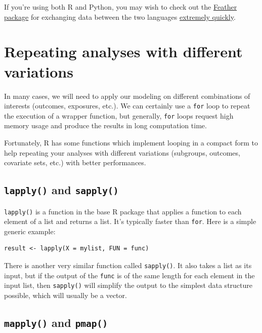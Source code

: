 \documentclass[
]{book}
\begin{document}
If you're using both R and Python, you may wish to check out the \href{https://www.rdocumentation.org/packages/feather/versions/0.3.3}{Feather package} for exchanging data between the two languages \href{https://blog.rstudio.com/2016/03/29/feather/}{extremely quickly}.

\section{Repeating analyses with different variations}\label{repeating-analyses-with-different-variations}

In many cases, we will need to apply our modeling on different combinations of interests (outcomes, exposures, etc.). We can certainly use a \texttt{for} loop to repeat the execution of a wrapper function, but generally, \texttt{for} loops request high memory usage and produce the results in long computation time.

Fortunately, R has some functions which implement looping in a compact form to help repeating your analyses with different variations (subgroups, outcomes, covariate sets, etc.) with better performances.

\subsection{\texorpdfstring{\texttt{lapply()} and \texttt{sapply()}}{lapply() and sapply()}}\label{lapply-and-sapply}

\texttt{lapply()} is a function in the base R package that applies a function to each element of a list and returns a list. It's typically faster than \texttt{for}. Here is a simple generic example:

\begin{verbatim}
result <- lapply(X = mylist, FUN = func)
\end{verbatim}

There is another very similar function called \texttt{sapply()}. It also takes a list as its input, but if the output of the \texttt{func} is of the same length for each element in the input list, then \texttt{sapply()} will simplify the output to the simplest data structure possible, which will usually be a vector.

\subsection{\texorpdfstring{\texttt{mapply()} and \texttt{pmap()}}{mapply() and pmap()}}\label{mapply-and-pmap}
\end{document}
